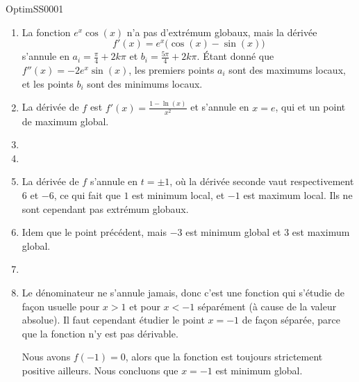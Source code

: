 
\begin{corrige}{OptimSS0001}

\begin{enumerate}

\item
La fonction $e^x\cos(x)$ n'a pas d'extrémum globaux, mais la dérivée
\begin{equation}
	f'(x)=e^x\big( \cos(x)-\sin(x) \big)
\end{equation}
s'annule en $a_i=\frac{ \pi }{ 4 }+2k\pi$ et $b_i=\frac{ 5\pi }{ 4 }+2k\pi$. Étant donné que $f''(x)=-2e^x\sin(x)$, les premiers points $a_i$ sont des maximums locaux, et les points $b_i$ sont des minimums locaux.

\item
La dérivée de $f$ est $f'(x)=\frac{ 1-\ln(x) }{ x^2 }$ et s'annule en $x=e$, qui et un point de maximum global.
\item
\item
\item
La dérivée de $f$ s'annule en $t=\pm 1$, où la dérivée seconde vaut respectivement $6$ et $-6$, ce qui fait que $1$ est minimum local, et $-1$ est maximum local. Ils ne sont cependant pas extrémum globaux.

\item
Idem que le point précédent, mais $-3$ est minimum global et $3$ est maximum global.

\item
\item
Le dénominateur ne s'annule jamais, donc c'est une fonction qui s'étudie de façon usuelle pour $x>1$ et pour $x<-1$ séparément (à cause de la valeur absolue). Il faut cependant étudier le point $x=-1$ de façon séparée, parce que la fonction n'y est pas dérivable.

Nous avons $f(-1)=0$, alors que la fonction est toujours strictement positive ailleurs. Nous concluons que $x=-1$ est minimum global.
\end{enumerate}

\end{corrige}
